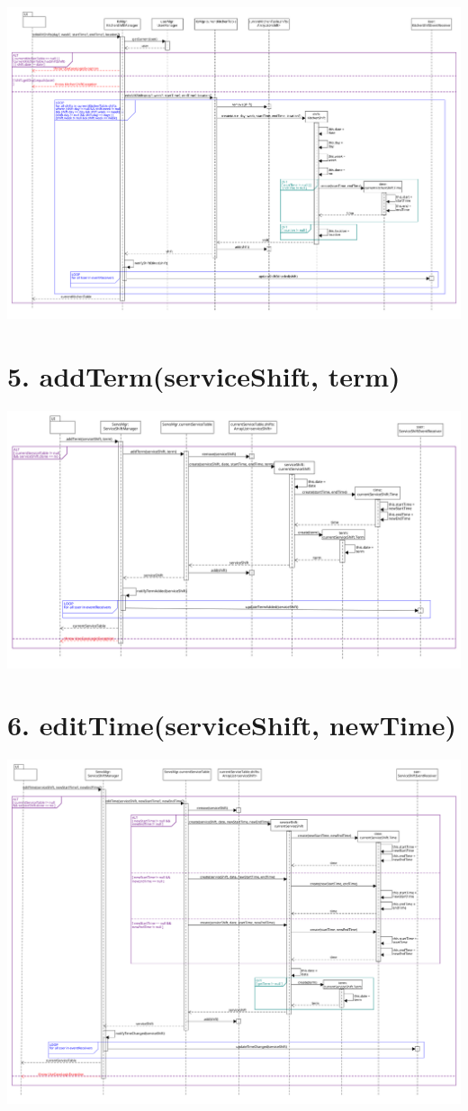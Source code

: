 \begin{center}
  \includegraphics[scale = 0.23]{images/DSD/Esame DSD 1c.png}
\end{center}
\pagebreak
\section*{5. addTerm(serviceShift, term)}

\begin{center}
  \includegraphics[scale = 0.28]{images/DSD/Esame DSD 5.png}
\end{center}
\pagebreak
\section*{6. editTime(serviceShift, newTime)}

\begin{center}
  \includegraphics[scale = 0.24]{images/DSD/Esame DSD 6.png}
\end{center}
\pagebreak


